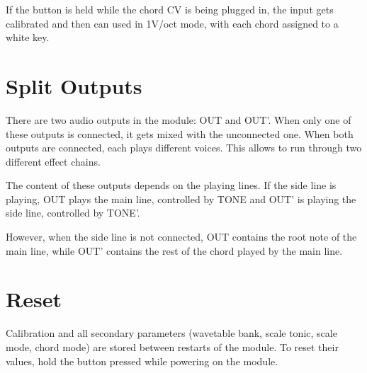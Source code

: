 \documentclass[10pt,nofoldmark,nocombine]{leaflet} %
\begin{document}
If the button is held while the chord CV is being plugged in, the input gets calibrated and then can used in 1V/oct mode, with each chord assigned to a white key.

\section{Split Outputs}

There are two audio outputs in the module: OUT and OUT'. When only one of these outputs is connected, it gets mixed with the unconnected one. When both outputs are connected, each plays different voices. This allows to run through two different effect chains.

The content of these outputs depends on the playing lines. If the side line is playing, OUT plays the main line, controlled by TONE and OUT' is playing the side line, controlled by TONE'.

However, when the side line is not connected, OUT contains the root note of the main line, while OUT' contains the rest of the chord played by the main line.

\section{Reset}

Calibration and all secondary parameters (wavetable bank, scale tonic, scale mode, chord mode) are stored between restarts of the module. To reset their values, hold the button pressed while powering on the module.
\end{document}
